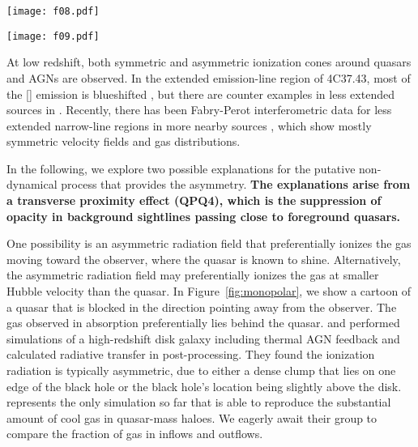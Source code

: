 \documentclass[iop]{emulateapj}
\begin{document}
\begin{SCfigure*}[10][!th]
\texttt{[image: f08.pdf]}
\caption{A cartoon showing a unipolar quasar. The gas observed in low- to intermediate-ion
absorption preferentially lies behind the quasar, and is shadowed from the ionizing radiation.}
\label{fig:monopolar}
\end{SCfigure*}
\begin{SCfigure*}[10][!bh]
\texttt{[image: f09.pdf]}
\caption{A cartoon showing the finite lifetime of quasar episodes as an explanation to the
asymmetric absorption. The setup on the left shows that the foreground quasar has not been shining
long enough for its ionizing radiation to reach the gas behind it, when the light from the
background quasar reaches. The setup on the right shows the scenario after an amount of time
comparable to the light travelling time across CGM scale. Gas in front of the foreground quasar
has been ionized, by the time the light from the background quasar reaches.}
\label{fig:lighttravel}
\end{SCfigure*}

At low redshift, both symmetric and asymmetric ionization cones around quasars and AGNs are
observed. In the extended emission-line region of 4C37.43, most of the [] emission is
blueshifted \citep{FuStockton07}, but there are counter examples in less extended sources in
\cite{FuStockton09}. Recently, there has been Fabry-Perot interferometric data for less extended
narrow-line regions in more nearby sources \citep{Keel+15,Keel+17}, which show mostly symmetric
velocity fields and gas distributions.

In the following, we explore two possible explanations for the putative non-dynamical process that
provides the asymmetry.
{\bf The explanations arise from a transverse proximity effect (QPQ4), which is the suppression of
opacity in background sightlines passing close to foreground quasars.}

One possibility is an asymmetric radiation field that preferentially ionizes the gas moving toward
the observer, where the quasar is known to shine. Alternatively, the asymmetric radiation field
may preferentially ionizes the gas at smaller Hubble velocity than the quasar. In
Figure~\ref{fig:monopolar}, we show a cartoon of a quasar that is blocked in the direction
pointing away from the observer. The gas observed in absorption preferentially lies behind the
quasar.
\cite{Roos+15} and \cite{GaborBournaud14} performed simulations of a high-redshift disk galaxy
including thermal AGN feedback and calculated radiative transfer in post-processing. They found
the ionization radiation is typically asymmetric, due to either a dense clump that lies on one
edge of the black hole or the black hole's location being slightly above the disk.
\cite{FaucherGiguere+16} represents the only simulation so far that is able to reproduce the
substantial amount of cool gas in quasar-mass haloes. We eagerly await their group to compare the
fraction of gas in inflows and outflows.
\end{document}
